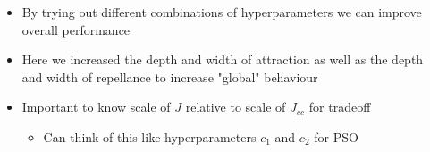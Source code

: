\documentclass{beamer}
\begin{document}
\begin{frame}
\begin{columns}[T]
\begin{center}
    \end{center}
    \begin{itemize}
      \item<1-> By trying out different combinations of hyperparameters we can improve overall performance
      \item<1-> Here we increased the depth and width of attraction as well as the depth and width of repellance to increase "global" behaviour
      \item<2-> Important to know scale of $J$ relative to scale of $J_{cc}$ for tradeoff
      \begin{itemize}
        \item<2-> Can think of this like hyperparameters $c_1$ and $c_2$ for PSO
      \end{itemize}
    \end{itemize}
\end{columns}
\end{frame}
\end{document}
